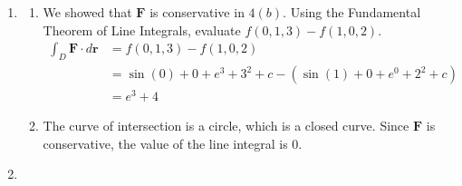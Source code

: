 \documentclass[a4paper, 12pt]{article}
\begin{document}
\begin{enumerate}[leftmargin=*,label=\textbf{\arabic*.}]
\begin{enumerate}[leftmargin=*,label=\textbf{\alph*.}]
Take partial derivative with respect to $z$.
\begin{align*}\frac{\partial f}{\partial z}&=\frac{\partial}{\partial z}\left(\sin\left(xy^2\right)+xyz^2+{e}^{yz}+h(z)\right)=2xyz+y{e}^{yz}+h_z(z)\\[1em]&=2xyz+y{e}^{yz}+2z\implies h_z(z)=2z\end{align*}
\[\int\frac{\partial f}{\partial z}\,dz=\int\left(2xyz+y{e}^{yz}+2z\right)\,dz=\sin\left(xy^2\right)+xyz^2+{e}^{yz}+z^2+c\]

The potential function for $\mathbf{F}$ is
\[\boxed{f(x,y,z)=\sin\left(xy^2\right)+xyz^2+{e}^{yz}+z^2+c,\quad c\in\mathbb{R}}\]

\end{enumerate}

\item \begin{enumerate}[leftmargin=*,label=\textbf{\alph*.}]
\item We showed that $\mathbf{F}$ is conservative in $4(b)$. Using the Fundamental Theorem of Line Integrals, evaluate $f(0,1,3)-f(1,0,2)$.
\begin{align*}\int_D\mathbf{F}\cdot d\mathbf{r}&=f(0,1,3)-f(1,0,2)\\[1em]&=\sin\left(0\right)+0+{e}^{3}+3^2+c-\left(\sin\left(1\right)+0+{e}^{0}+2^2+c\right)\\[1em]&=\boxed{{e}^3+4}\end{align*}

\item The curve of intersection is a circle, which is a closed curve. Since $\mathbf{F}$ is conservative, the value of the line integral is $\boxed0$.
\end{enumerate}

\item\leavevmode\vspace{-1.5em}
\begin{center}
\end{center}
\end{enumerate}
\end{document}
